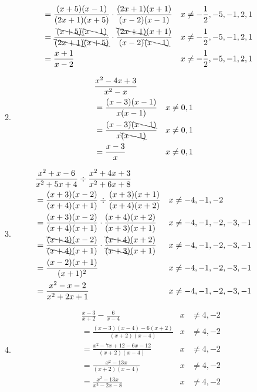 \documentclass[paper=a4, fontsize=11pt]{scrartcl}
\begin{document}
\begin{enumerate}
\begin{enumerate}
\begin{align*}
            &=\frac{(x+5)(x-1)}{(2x+1)(x+5)}\cdot \frac{(2x+1)(x+1)}{(x-2)(x-1)}&x&\neq-\frac{1}{2},-5,-1,2,1\\
            &=\frac{\bcancel{(x+5)}\bcancel{(x-1)}}{\bcancel{(2x+1)}\bcancel{(x+5)}}\cdot \frac{\bcancel{(2x+1)}(x+1)}{(x-2)\bcancel{(x-1)}}&x&\neq-\frac{1}{2},-5,-1,2,1\\
            &=\frac{x+1}{x-2}&x&\neq-\frac{1}{2},-5,-1,2,1\\
        \end{align*}
        \item \begin{align*}
            &\frac{x^2-4x+3}{x^2-x}\\
            &=\frac{(x-3)(x-1)}{x(x-1)}&x&\neq0,1\\
            &=\frac{(x-3)\bcancel{(x-1)}}{x\bcancel{(x-1)}}&x&\neq0,1\\
            &=\frac{x-3}{x}&x&\neq0,1\\
        \end{align*}
        \item \begin{align*}
            &\frac{x^2+x-6}{x^2+5x+4}\div\frac{x^2+4x+3}{x^2+6x+8}\\
            &=\frac{(x+3)(x-2)}{(x+4)(x+1)}\div\frac{(x+3)(x+1)}{(x+4)(x+2)}&x&\neq-4,-1,-2\\
            &=\frac{(x+3)(x-2)}{(x+4)(x+1)}\cdot \frac{(x+4)(x+2)}{(x+3)(x+1)}&x&\neq-4,-1,-2,-3,-1\\
            &=\frac{\bcancel{(x+3)}(x-2)}{\bcancel{(x+4)}(x+1)}\cdot \frac{\bcancel{(x+4)}(x+2)}{\bcancel{(x+3)}(x+1)}&x&\neq-4,-1,-2,-3,-1\\
            &=\frac{(x-2)(x+1)}{(x+1)^2}&x&\neq-4,-1,-2,-3,-1\\
            &=\frac{x^2-x-2}{x^2+2x+1}&x&\neq-4,-1,-2,-3,-1\\
        \end{align*}
        \item \begin{align*}
            &\frac{x-3}{x+2}-\frac{6}{x-4}&x&\neq4,-2\\
            &=\frac{(x-3)(x-4)-6(x+2)}{(x+2)(x-4)}&x&\neq4,-2\\
            &=\frac{x^2-7x+12-6x-12}{(x+2)(x-4)}&x&\neq4,-2\\
            &=\frac{x^2-13x}{(x+2)(x-4)}&x&\neq4,-2\\
            &=\frac{x^2-13x}{x^2-2x-8}&x&\neq4,-2\\
        \end{align*}

\end{enumerate}
\end{enumerate}
\end{document}
